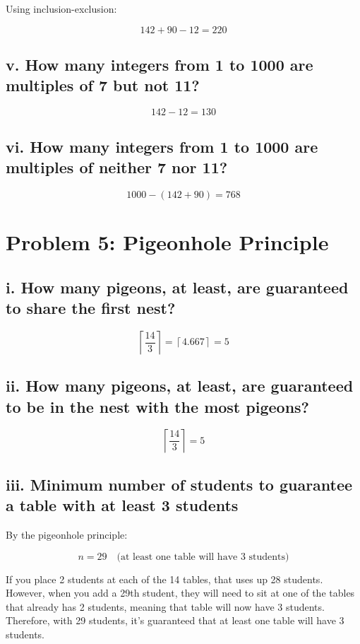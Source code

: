 \documentclass{article}
\begin{document}
Using inclusion-exclusion:

\[
142 + 90 - 12 = 220
\]

\subsection*{v. How many integers from 1 to 1000 are multiples of 7 but not 11?}

\[
142 - 12 = 130
\]

\subsection*{vi. How many integers from 1 to 1000 are multiples of neither 7 nor 11?}

\[
1000 - (142+90) = 768
\]

\newpage

\section*{Problem 5: Pigeonhole Principle}

\subsection*{i. How many pigeons, at least, are guaranteed to share the first nest?}

\[
\left\lceil \frac{14}{3} \right\rceil = \left\lceil 4.667 \right\rceil = 5
\]

\subsection*{ii. How many pigeons, at least, are guaranteed to be in the nest with the most pigeons?}

\[
\left\lceil \frac{14}{3} \right\rceil = 5
\]

\subsection*{iii. Minimum number of students to guarantee a table with at least 3 students}

By the pigeonhole principle:

\[
n = 29 \quad \text{(at least one table will have 3 students)}
\]

If you place 2 students at each of the 14 tables, that uses up 28 students.
However, when you add a 29th student, they will need to sit at one of the
tables that already has 2 students, meaning that table will now have 3 students.
Therefore, with 29 students, it's guaranteed that at least one table will have 3
students.
\end{document}
